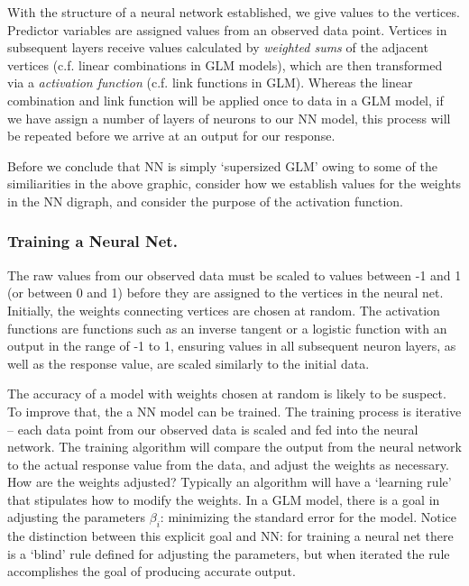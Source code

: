 \documentclass[12pt]{article}
\begin{document}

With the structure of a neural network established, we give values to the vertices.  Predictor variables are assigned values from an observed data
point.  Vertices in subsequent layers receive values calculated by \textit{weighted sums} of the adjacent vertices (c.f. linear combinations in GLM
models), which are then transformed via a \textit{activation function} (c.f. link functions in GLM).  Whereas the linear combination and link
function will be applied once to data in a GLM model, if we have assign a number of layers of neurons to our NN model, this process will be
repeated before we arrive at an output for our response.  


Before we conclude that NN is simply `supersized GLM' owing to some of the similiarities in the above graphic, consider how we establish values for
the weights in the NN digraph, and consider the purpose of the activation function.

	\subsubsection{Training a Neural Net.}
The raw values from our observed data must be scaled to values between -1 and 1 (or between 0 and 1) before they are assigned to the vertices in 
the neural net.  Initially, the weights connecting vertices are chosen at random.  The activation functions are functions such as an inverse 
tangent or a logistic function with an output in the range of -1 to 1, ensuring values in all subsequent neuron layers, as well as the response 
value, are scaled similarly to the initial data.

The accuracy of a model with weights chosen at random is likely to be suspect.  To improve that, the a NN model can be trained.  The training
process is iterative -- each data point from our observed data is scaled and fed into the neural network.  The training algorithm will compare the
output from the neural network to the actual response value from the data, and adjust the weights as necessary.  How are the weights adjusted?  
Typically an algorithm will have a `learning rule' that stipulates how to modify the weights.  In a GLM model, there is a goal in adjusting the
parameters $\beta_i$: minimizing the standard error for the model.  Notice the distinction between this explicit goal and NN: for training a neural
net there is a `blind' rule defined for adjusting the parameters, but when iterated the rule accomplishes the goal of producing accurate output.
\end{document}
